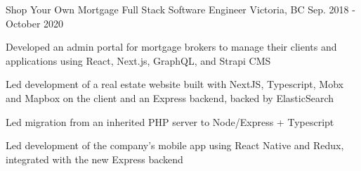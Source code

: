 \begin{cventries}

\cventry
{Shop Your Own Mortgage} %
{Full Stack Software Engineer} %
{Victoria, BC} %
{Sep. 2018 - October 2020} %
{ %
\begin{cvitems}
\item {Developed an admin portal for mortgage brokers to manage their clients and applications using React, Next.js, GraphQL, and Strapi CMS}
\item {Led development of a real estate website built with NextJS, Typescript, Mobx and Mapbox on the client and an Express backend, backed by ElasticSearch}
\item {Led migration from an inherited PHP server to Node/Express + Typescript}
\item {Led development of the company's mobile app using React Native and Redux, integrated with the new Express backend}
\end{cvitems}
}

\end{cventries}